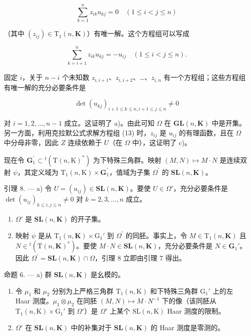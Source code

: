 \[
\sum_ {k = 1} ^ {n} z _ {i k} u _ {k j} = 0 \quad (1 \leqslant i <   j \leqslant n)
\]

（其中 \((z_{ij})\in \mathrm{T}_1(n,\mathbf{K})\)）有唯一解。这个方程组可以写成

\[
\sum_ {k = i + 1} ^ {n} z _ {i k} u _ {k j} = - u _ {i j} \quad (1 \leqslant i <   j \leqslant n).\tag{13}
\]

固定 \(i\)，关于 \(n - i\) 个未知数 \(z_{i,i+1}\)、\(z_{i,i+2}\)、\ldots、\(z_{i,n}\) 有一个方程组；这些方程组有唯一解的充分必要条件是

\[
\det (u _ {k j}) _ {i + 1 \leqslant k \leqslant n, i + 1 \leqslant j \leqslant n} \neq 0
\]

对 \(i = 1,2,\ldots ,n - 1\) 成立。这证明了 a)。由此可知 \(\Omega\) 在 \(\mathbf{GL}(n,\mathbf{K})\) 中是开集。另一方面，利用克拉默公式求解方程组 (13) 时，\(z_{ij}\) 是 \(u_{ij}\) 的有理函数，且在 \(\Omega\) 中分母非零，因此 \(Z\) 连续依赖于 \(U\)（在 \(\Omega\) 中），这证明了 c)。

现在令 \(\mathbf{G}_{1}^{\prime}\subset{}^{t}(\mathrm{T}(n,\mathrm{K})^{*})\) 为下特殊三角群。映射 \((M,N)\mapsto M\cdot N\) 是连续双射 \(\psi\)，其定义域为 \(\mathrm{T}_{1}(n,\mathrm{K})\times\mathbf{G}_{1}^{\prime}\)，值域为子集 \(\Omega^{\prime}\) 的 \(\mathbf{SL}(n,\mathbf{K})\)。

引理 8. --- a) 令 \(U = (u_{ij}) \in \mathbf{SL}(n, \mathbf{K})\)。要使 \(U \in \Omega'\)，充分必要条件是 \(\det(u_{ij})_{k \leqslant i,j \leqslant n} \neq 0\) 对 \(k = 2,3,\ldots,n\) 成立。

\begin{enumerate}
\def\labelenumi{\alph{enumi})}
\setcounter{enumi}{1}
\item
  \(\Omega'\) 是 \(\mathbf{SL}(n,\mathbf{K})\) 的开子集。
\item
  映射 \(\psi\) 是从 \(\mathrm{T}_1(n,\mathbf{K})\times \mathrm{G}_1'\) 到 \(\Omega^{\prime}\) 的同胚。事实上，令 \(M\in \mathrm{T}_1(n,\mathbf{K})\) 且 \(N\in {}^t (\mathrm{T}(n,\mathbf{K})^*)\)。要使 \(M\cdot N\in \mathbf{SL}(n,\mathbf{K})\)，充分必要条件是 \(N\in \mathbf{G}_1'\)。因此 \(\Omega^{\prime} = \mathbf{SL}(n,\mathbf{K})\cap \Omega\)，引理 8 立即由引理 7 得出。
\end{enumerate}

命题 6. --- a) 群 \(\mathbf{SL}(n,\mathbf{K})\) 是幺模的。

\begin{enumerate}
\def\labelenumi{\alph{enumi})}
\setcounter{enumi}{1}
\item
  令 \(\mu_1\) 和 \(\mu_2\) 分别为上严格三角群 \(\mathrm{T}_1(n, \mathrm{K})\) 和下特殊三角群 \(\mathrm{G}_1'\) 上的左 Haar 测度。\(\mu_1 \otimes \mu_2\) 在同胚 \((M, N) \mapsto M \cdot N^{-1}\) 下的像（该同胚从 \(\mathrm{T}_1(n, \mathrm{K}) \times \mathrm{G}_1'\) 到 \(\Omega'\)）是 \(\Omega'\) 上某个 \(\mathrm{SL}(n, \mathrm{K})\) Haar 测度的限制。
\item
  \(\Omega'\) 在 \(\mathbf{SL}(n,\mathbf{K})\) 中的补集对于 \(\mathbf{SL}(n,\mathbf{K})\) 的 Haar 测度是零测的。
\end{enumerate}

